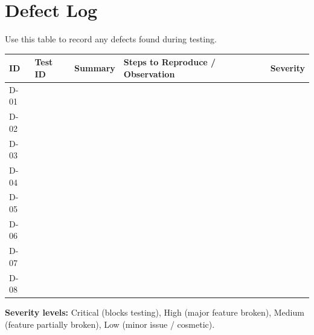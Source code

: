 \documentclass[a4paper,11pt]{article}
\begin{document}
	\newpage
	\section*{Defect Log}
	\label{sec:defects}
	
	Use this table to record any defects found during testing.
	
	\begin{longtable}{p{1.0cm} p{1.5cm} p{3.5cm} p{5.5cm} p{1.5cm}}
		\toprule
		\textbf{ID} & \textbf{Test ID} & \textbf{Summary} & \textbf{Steps to Reproduce / Observation} & \textbf{Severity} \\
		\midrule
		\endhead
		D-01 & & & & \\[1.2cm]
		\hline
		D-02 & & & & \\[1.2cm]
		\hline
		D-03 & & & & \\[1.2cm]
		\hline
		D-04 & & & & \\[1.2cm]
		\hline
		D-05 & & & & \\[1.2cm]
		\hline
		D-06 & & & & \\[1.2cm]
		\hline
		D-07 & & & & \\[1.2cm]
		\hline
		D-08 & & & & \\[1.2cm]
		\bottomrule
	\end{longtable}
	
	\textbf{Severity levels:} Critical (blocks testing), High (major feature broken), Medium (feature partially broken), Low (minor issue / cosmetic).
	
\end{document}
